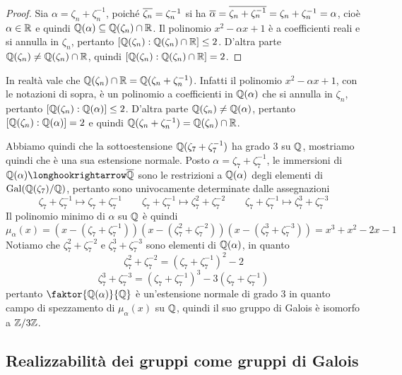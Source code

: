 \documentclass[11pt]{scrartcl}
\begin{document}
	\begin{proof}
		Sia $\alpha = \zeta_n + \zeta_n^{-1}$, poiché $\overline{\zeta_n} = \zeta_n^{-1}$
		si ha $\overline{\alpha} = \overline{\zeta_n + \zeta_n^{-1}} = \zeta_n + \zeta_n^{-1} = \alpha$,
		cioè $\alpha \in \mathbb R$ e quindi $\mathbb Q(\alpha) \subseteq \mathbb Q(\zeta_n)\cap \mathbb R$.
		Il polinomio $x^2 - \alpha x + 1$ è a coefficienti reali e si annulla in 
		$\zeta_n$, pertanto $[\mathbb Q(\zeta_n):\mathbb Q(\zeta_n)\cap \mathbb R]\leq 2$. D'altra
		parte $\mathbb Q(\zeta_n)\neq \mathbb Q(\zeta_n)\cap \mathbb R$, quindi 
		$[\mathbb Q(\zeta_n):\mathbb Q(\zeta_n)\cap \mathbb R] = 2$.
	\end{proof}
	
	\begin{remark}
		In realtà vale che $\mathbb Q(\zeta_n)\cap \mathbb R = \mathbb Q(\zeta_n + \zeta_n^{-1})$.
		Infatti il polinomio $x^2 - \alpha x + 1$, con le notazioni di sopra, 
		è un polinomio a coefficienti in $\mathbb Q(\alpha)$ che si annulla in $\zeta_n$,
		pertanto $[\mathbb Q(\zeta_n):\mathbb Q(\alpha)] \leq 2$. D'altra parte $\mathbb Q(\zeta_n)\neq \mathbb Q(\alpha)$,
		pertanto $[\mathbb Q(\zeta_n):\mathbb Q(\alpha)] = 2$ e quindi 
		$\mathbb Q(\zeta_n + \zeta_n^{-1}) = \mathbb Q(\zeta_n)\cap \mathbb R$.
	\end{remark}
	
	Abbiamo quindi che la sottoestensione $\mathbb Q(\zeta_7 + \zeta_7^{-1})$ ha grado
	3 su $\mathbb Q$, mostriamo quindi che è una sua estensione normale. Posto 
	$\alpha = \zeta_7 + \zeta_7^{-1}$, le immersioni di 
	$\QQ(\alpha) \longhookrightarrow \ol{\QQ}$ sono le restrizioni a $\mathbb Q(\alpha)$
	degli elementi di $\operatorname{Gal}(\mathbb Q(\zeta_7)/\mathbb Q)$, pertanto sono univocamente determinate
	dalle assegnazioni 
	\[
	\zeta_7 + \zeta_7^{-1} \longmapsto \zeta_7 + \zeta_7^{-1}\qquad
	\zeta_7 + \zeta_7^{-1} \longmapsto \zeta_7^2 + \zeta_7^{-2}\qquad
	\zeta_7 + \zeta_7^{-1} \longmapsto \zeta_7^3 + \zeta_7^{-3}
	\]
	Il polinomio minimo di $\alpha$ su $\mathbb Q$ è quindi 
	\[
	\mu_{\alpha}(x) = (x - (\zeta_7 + \zeta_7^{-1}))(x - (\zeta_7^2 + \zeta_7^{-2}))(x - (\zeta_7^3 + \zeta_7^{-3}))
	= x^3 + x^2 - 2x - 1
	\]
	Notiamo che $\zeta_7^2 + \zeta_7^{-2}$ e $\zeta_7^3 + \zeta_7^{-3}$ sono
	elementi di $\mathbb Q(\alpha)$, in quanto
	\[
	\zeta_7^2 + \zeta_7^{-2} = (\zeta_7 + \zeta_7^{-1})^2 - 2
	\]
	\[
	\zeta_7^3 + \zeta_7^{-3} = (\zeta_7 + \zeta_7^{-1})^3 - 3(\zeta_7 + \zeta_7^{-1})
	\]
	pertanto $\faktor{\QQ(\alpha)}{\QQ}$ è un'estensione normale di grado 3 in 
	quanto campo di spezzamento di $\mu_{\alpha}(x)$ su $\mathbb Q$,
	quindi il suo gruppo di Galois è isomorfo a $\mathbb{Z}/{3}\mathbb{Z}$.
	
	\newpage
	
	\subsection{Realizzabilità dei gruppi come gruppi di Galois}
	
\end{document}
